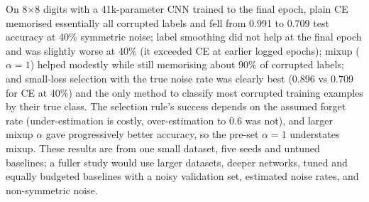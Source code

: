 On 8$\times$8 digits with a 41k-parameter CNN trained to the final epoch, plain CE memorised essentially all corrupted labels and fell from 0.991 to 0.709 test accuracy at 40\% symmetric noise; label smoothing did not help at the final epoch and was slightly worse at 40\% (it exceeded CE at earlier logged epochs); mixup ($\alpha{=}1$) helped modestly while still memorising about 90\% of corrupted labels; and small-loss selection with the true noise rate was clearly best (0.896 vs 0.709 for CE at 40\%) and the only method to classify most corrupted training examples by their true class. The selection rule's success depends on the assumed forget rate (under-estimation is costly, over-estimation to 0.6 was not), and larger mixup $\alpha$ gave progressively better accuracy, so the pre-set $\alpha{=}1$ understates mixup. These results are from one small dataset, five seeds and untuned baselines; a fuller study would use larger datasets, deeper networks, tuned and equally budgeted baselines with a noisy validation set, estimated noise rates, and non-symmetric noise.
